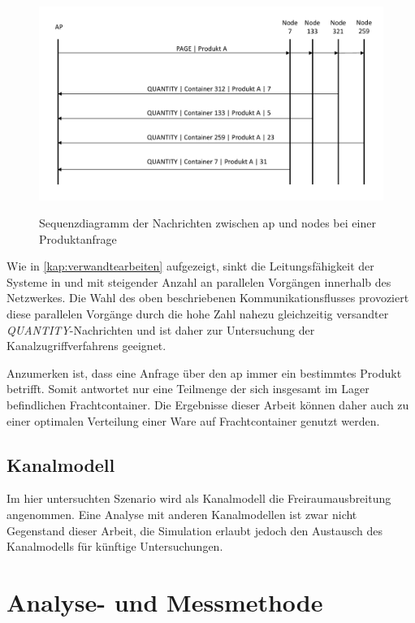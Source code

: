 \begin{figure}[bth]
        \myfloatalign
        {\includegraphics[width=1\linewidth]{gfx/Sequenzdiagramm}} 
        \caption[Sequenzdiagramm]{Sequenzdiagramm der Nachrichten zwischen \acs{ap} und \glspl{node} bei einer Produktanfrage}\label{fig:sequenz}
\end{figure}

Wie in \autoref{kap:verwandtearbeiten} aufgezeigt, sinkt die Leitungsfähigkeit der Systeme in \citep{GreenOrbs} und \citep{inBinTestbed} mit steigender Anzahl an parallelen Vorgängen innerhalb des Netzwerkes. Die Wahl des oben beschriebenen Kommunikationsflusses provoziert diese parallelen Vorgänge durch die hohe Zahl nahezu gleichzeitig versandter \emph{QUANTITY}-Nachrichten und ist daher zur Untersuchung der Kanalzugriffverfahrens geeignet.

Anzumerken ist, dass eine Anfrage über den \ac{ap} immer ein bestimmtes Produkt betrifft. Somit antwortet nur eine Teilmenge der sich insgesamt im Lager befindlichen Frachtcontainer.
Die Ergebnisse dieser Arbeit können daher auch zu einer optimalen Verteilung einer Ware auf Frachtcontainer genutzt werden.


\subsection{Kanalmodell}
Im hier untersuchten Szenario wird als Kanalmodell die Freiraumausbreitung angenommen. 
Eine Analyse mit anderen Kanalmodellen ist zwar nicht Gegenstand dieser Arbeit, die Simulation erlaubt jedoch den Austausch des Kanalmodells für künftige Untersuchungen.

\section{Analyse- und Messmethode}

